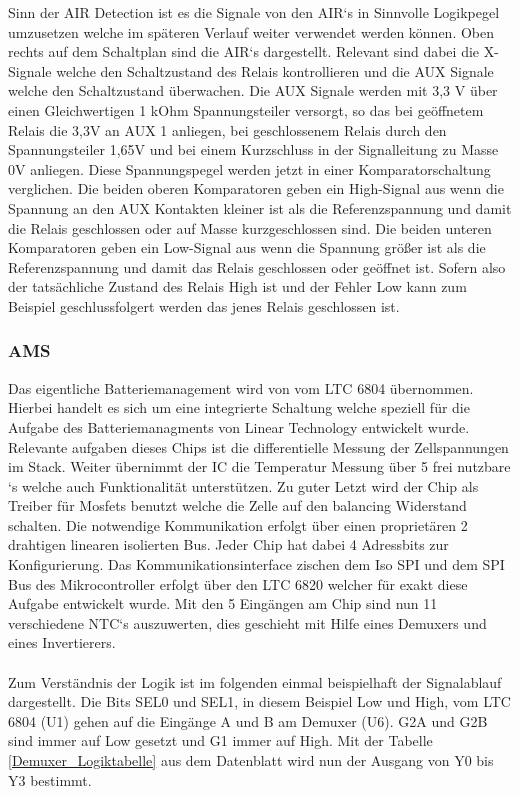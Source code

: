 Sinn der \ac{AIR} Detection ist es die Signale von den \ac{AIR}`s in Sinnvolle Logikpegel umzusetzen welche im späteren Verlauf weiter verwendet werden können. Oben rechts auf dem Schaltplan sind die \ac{AIR}`s dargestellt. Relevant sind dabei die X-Signale welche den Schaltzustand des Relais kontrollieren und die AUX Signale welche den Schaltzustand überwachen. Die AUX Signale werden mit 3,3 V über einen Gleichwertigen 1 kOhm Spannungsteiler versorgt, so das bei geöffnetem Relais die 3,3V an AUX 1 anliegen, bei geschlossenem Relais durch den Spannungsteiler 1,65V und bei einem Kurzschluss in der Signalleitung zu Masse 0V anliegen. Diese Spannungspegel werden jetzt in einer Komparatorschaltung verglichen. Die beiden oberen Komparatoren geben ein High-Signal aus wenn die Spannung an den AUX Kontakten kleiner ist als die Referenzspannung und damit die Relais geschlossen oder auf Masse kurzgeschlossen sind. Die beiden unteren Komparatoren geben ein Low-Signal aus wenn die Spannung größer ist als die Referenzspannung und damit das Relais geschlossen oder geöffnet ist. Sofern also der tatsächliche Zustand des Relais High ist und der Fehler Low kann zum Beispiel geschlussfolgert werden das jenes Relais geschlossen ist.
\FloatBarrier
\subsubsection{\ac{AMS}}
Das eigentliche Batteriemanagement wird von vom LTC 6804 übernommen. Hierbei handelt es sich um eine integrierte Schaltung welche speziell für die Aufgabe des Batteriemanagments von Linear Technology entwickelt wurde. Relevante aufgaben dieses Chips ist die differentielle Messung der Zellspannungen im Stack. Weiter übernimmt der IC die Temperatur Messung über 5 frei nutzbare `s welche auch  Funktionalität unterstützen. Zu guter Letzt wird der Chip als Treiber für Mosfets benutzt welche die Zelle auf den balancing Widerstand schalten. Die notwendige Kommunikation erfolgt über einen proprietären 2 drahtigen linearen isolierten  Bus. Jeder Chip hat dabei 4 Adressbits zur Konfigurierung. Das Kommunikationsinterface zischen dem Iso \ac{SPI} und dem \ac{SPI} Bus des Mikrocontroller erfolgt über den LTC 6820 welcher für exakt diese Aufgabe entwickelt wurde. Mit den 5 Eingängen am Chip sind nun 11 verschiedene NTC`s auszuwerten, dies geschieht mit Hilfe eines Demuxers und eines Invertierers.
\\
\\
Zum Verständnis der Logik ist im folgenden einmal beispielhaft der Signalablauf dargestellt.
Die Bits SEL0 und SEL1, in diesem Beispiel Low und High, vom LTC 6804 (U1) gehen auf die Eingänge A und B am Demuxer (U6). G2A und G2B sind immer auf Low gesetzt und G1 immer auf High. Mit der Tabelle \ref{Demuxer_Logiktabelle} aus dem Datenblatt wird nun der Ausgang von Y0 bis Y3 bestimmt.

